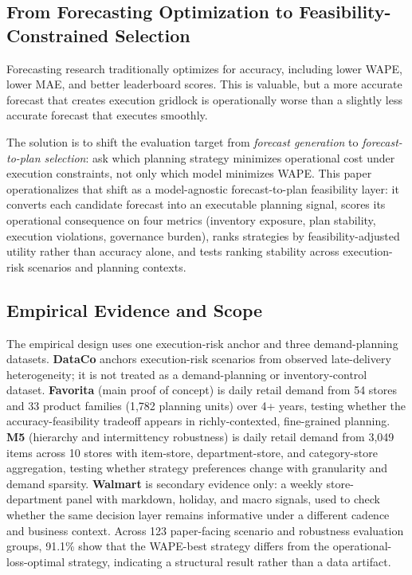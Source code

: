 \subsection{From Forecasting Optimization to Feasibility-Constrained Selection}

Forecasting research traditionally optimizes for accuracy, including lower WAPE, lower MAE, and better leaderboard scores. This is valuable, but a more accurate forecast that creates execution gridlock is operationally worse than a slightly less accurate forecast that executes smoothly.

The solution is to shift the evaluation target from \textit{forecast generation} to \textit{forecast-to-plan selection}: ask which planning strategy minimizes operational cost under execution constraints, not only which model minimizes WAPE. This paper operationalizes that shift as a model-agnostic forecast-to-plan feasibility layer: it converts each candidate forecast into an executable planning signal, scores its operational consequence on four metrics (inventory exposure, plan stability, execution violations, governance burden), ranks strategies by feasibility-adjusted utility rather than accuracy alone, and tests ranking stability across execution-risk scenarios and planning contexts.

\subsection{Empirical Evidence and Scope}

The empirical design uses one execution-risk anchor and three demand-planning datasets. \textbf{DataCo} anchors execution-risk scenarios from observed late-delivery heterogeneity; it is not treated as a demand-planning or inventory-control dataset. \textbf{Favorita} (main proof of concept) is daily retail demand from 54 stores and 33 product families (1,782 planning units) over 4+ years, testing whether the accuracy-feasibility tradeoff appears in richly-contexted, fine-grained planning. \textbf{M5} (hierarchy and intermittency robustness) is daily retail demand from 3,049 items across 10 stores with item-store, department-store, and category-store aggregation, testing whether strategy preferences change with granularity and demand sparsity. \textbf{Walmart} is secondary evidence only: a weekly store-department panel with markdown, holiday, and macro signals, used to check whether the same decision layer remains informative under a different cadence and business context. Across 123 paper-facing scenario and robustness evaluation groups, 91.1\% show that the WAPE-best strategy differs from the operational-loss-optimal strategy, indicating a structural result rather than a data artifact.

